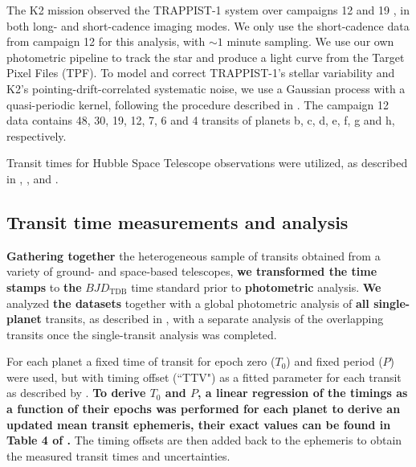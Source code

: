 \documentclass[twocolumn]{aastex63}
\begin{document}
The K2 mission \citep{Howell2014} observed the TRAPPIST-1 system over campaigns 12 and 19 \citep{Luger2017a}, in both long- and short-cadence imaging modes. We only use the short-cadence data from campaign 12 for this analysis, with $\sim1$ minute sampling. We use our own photometric pipeline to track the star and produce a light curve from the Target Pixel Files (TPF). To model and correct TRAPPIST-1's stellar variability and K2's pointing-drift-correlated systematic noise, we use a Gaussian process with a quasi-periodic kernel, following the procedure described in \cite{Grimm2018}. The campaign 12 data contains 48, 30, 19, 12, 7, 6 and 4 transits of planets b, c, d, e, f, g and h, respectively. %

Transit times for Hubble Space Telescope observations were utilized, as described in \citet{Grimm2018}, \citet{deWit2016,deWit2018}, and \citet{Wakeford2019}.

\subsection{Transit time measurements and analysis}\label{sec:transit_time_measurements}


\textbf{Gathering together} the heterogeneous sample of transits obtained from a variety of ground- and space-based telescopes,  \textbf{we transformed the time stamps} to \textbf{the} $BJD_\mathrm{TDB}$ time standard prior to \textbf{photometric} analysis. \textbf{We} analyzed \textbf{the datasets} together with a global photometric analysis of \textbf{all single-planet} transits, as described in
\citet{Ducrot2020}, with a separate analysis of the overlapping transits once the single-transit analysis was completed.

For each planet a fixed time of transit for epoch zero ($T_{0}$) and fixed period ($P$) were used, but with timing offset (``TTV") as a fitted parameter for each transit as described by \cite{Ducrot2020}.  \textbf{To derive $T_{0}$ and $P$, a linear regression of the timings as a function of their epochs was performed for each planet to derive an updated mean transit ephemeris, their exact values can be found in Table 4 of \cite{Ducrot2020}.} The timing offsets are then added back to the ephemeris to obtain the measured transit times and uncertainties.
\end{document}
